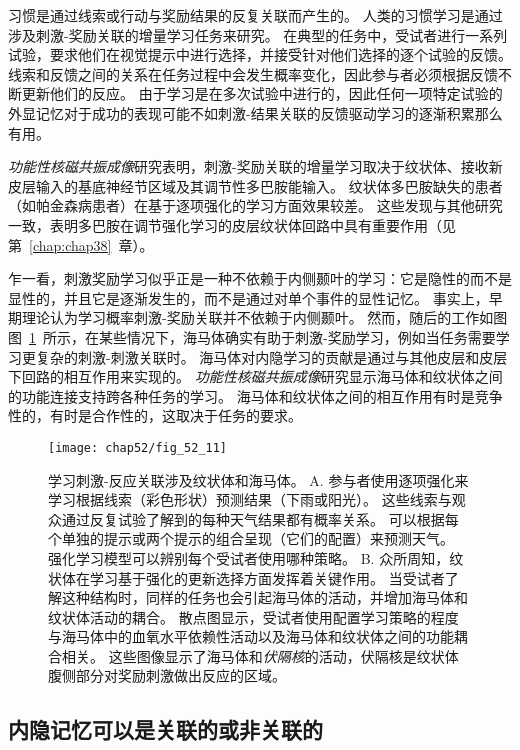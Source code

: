 习惯是通过线索或行动与奖励结果的反复关联而产生的。
人类的习惯学习是通过涉及刺激-奖励关联的增量学习任务来研究。
在典型的任务中，受试者进行一系列试验，要求他们在视觉提示中进行选择，并接受针对他们选择的逐个试验的反馈。
线索和反馈之间的关系在任务过程中会发生概率变化，因此参与者必须根据反馈不断更新他们的反应。
由于学习是在多次试验中进行的，因此任何一项特定试验的外显记忆对于成功的表现可能不如刺激-结果关联的反馈驱动学习的逐渐积累那么有用。


\textit{功能性核磁共振成像}研究表明，刺激-奖励关联的增量学习取决于纹状体、接收新皮层输入的基底神经节区域及其调节性多巴胺能输入。
纹状体多巴胺缺失的患者（如帕金森病患者）在基于逐项强化的学习方面效果较差。
这些发现与其他研究一致，表明多巴胺在调节强化学习的皮层纹状体回路中具有重要作用（见第~\ref{chap:chap38}~章）。


乍一看，刺激奖励学习似乎正是一种不依赖于内侧颞叶的学习：它是隐性的而不是显性的，并且它是逐渐发生的，而不是通过对单个事件的显性记忆。
事实上，早期理论认为学习概率刺激-奖励关联并不依赖于内侧颞叶。
然而，随后的工作如图图~\ref{fig:52_11}~所示，在某些情况下，海马体确实有助于刺激-奖励学习，例如当任务需要学习更复杂的刺激-刺激关联时。
海马体对内隐学习的贡献是通过与其他皮层和皮层下回路的相互作用来实现的。
\textit{功能性核磁共振成像}研究显示海马体和纹状体之间的功能连接支持跨各种任务的学习。
海马体和纹状体之间的相互作用有时是竞争性的，有时是合作性的，这取决于任务的要求。


\begin{figure}[htbp]
	\centering
	\texttt{[image: chap52/fig\_52\_11]}
	\caption{学习刺激-反应关联涉及纹状体和海马体\cite{duncan2018more}。
		A. 参与者使用逐项强化来学习根据线索（彩色形状）预测结果（下雨或阳光）。
		这些线索与观众通过反复试验了解到的每种天气结果都有概率关系。
		可以根据每个单独的提示或两个提示的组合呈现（它们的配置）来预测天气。
		强化学习模型可以辨别每个受试者使用哪种策略。
		B. 众所周知，纹状体在学习基于强化的更新选择方面发挥着关键作用。
		当受试者了解这种结构时，同样的任务也会引起海马体的活动，并增加海马体和纹状体活动的耦合。
		散点图显示，受试者使用配置学习策略的程度与海马体中的血氧水平依赖性活动以及海马体和纹状体之间的功能耦合相关。
		这些图像显示了海马体和\textit{伏隔核}的活动，伏隔核是纹状体腹侧部分对奖励刺激做出反应的区域。}
	\label{fig:52_11}
\end{figure}



\subsection{内隐记忆可以是关联的或非关联的}

